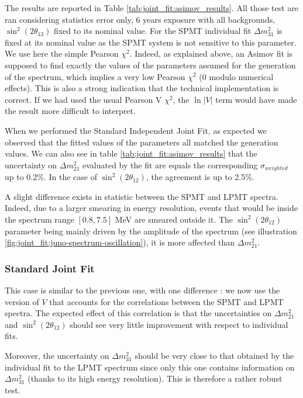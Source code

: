 \documentclass[../main.tex]{subfiles}
\begin{document}
The results are reported in Table \ref{tab:joint_fit:asimov_results}. All those test are ran considering statistics error only, 6 years exposure with all backgrounds, $\sin^2(2 \theta_{13})$ fixed to its nominal value. For the SPMT individual fit $\Delta m^2_{31}$ is fixed at its nominal value as the SPMT system is not sensitive to this parameter. We use here the simple Pearson $\chi^2$. Indeed, as explained above, an Asimov fit is supposed to find exactly the values of the parameters assumed for the generation of the spectrum, which implies a very low Pearson $\chi^2$ (0 modulo
numerical effects). This is also a strong indication that the technical implementation is correct. If we had used the usual Pearson V $\chi^2$, the $\ln|V|$ term would have made the result more difficult to interpret.


When we performed the Standard Independent Joint Fit, as expected we observed that the fitted values of the parameters all matched the generation values. We can also see in table \ref{tab:joint_fit:asimov_results} that the uncertainty on $\Delta m^2_{21}$ evaluated by the fit are equals the corresponding $\sigma_{weighted}$ up to 0.2\%. In the case  of $\sin^2(2 \theta_{12})$, the agreement is up to 2.5\%.

A slight difference exists in statistic between the SPMT and LPMT spectra. Indeed, due to a larger smearing in energy resolution, events that would be inside the spectrum range $[0.8, 7.5]$ MeV are
smeared outside it. The $\sin^2(2 \theta_{12})$ parameter being mainly driven by the amplitude of the
spectrum (see illustration \ref{fig:joint_fit:juno-spectrum-oscillation}), it is more affected than  $\Delta m^2_{21}$.


\subsubsection{Standard Joint Fit}

This case is similar to the previous one, with one difference : we now use the version of $V$ that accounts for the correlations between the SPMT and LPMT spectra. The expected effect of this correlation is that the uncertainties on $\Delta m^2_{21}$ and $\sin^{2}(2\theta_{12})$ should see very little improvement with respect to individual fits.

Moreover, the uncertainty on $\Delta m^2_{31}$ should be very close to that obtained by the individual fit to the LPMT spectrum since only this one contains information on $\Delta m^2_{31}$ (thanks to its high energy resolution). This is therefore a rather robust test.
\end{document}

